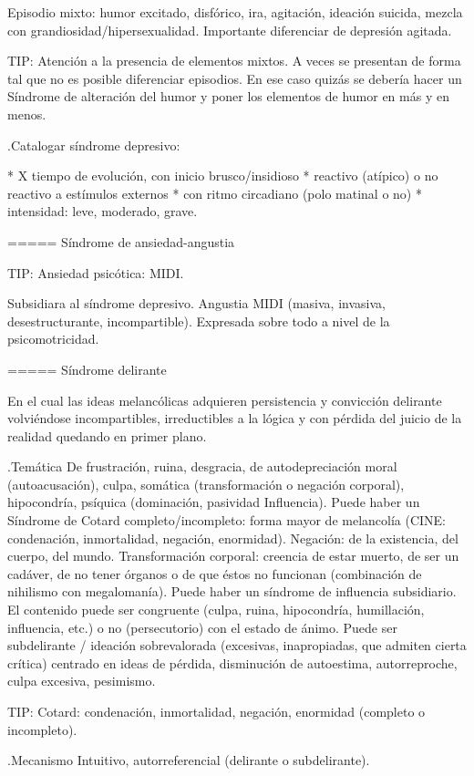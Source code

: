 \documentclass{scrbook}
\begin{document}
Episodio mixto: humor excitado, disfórico, ira, agitación, ideación suicida, mezcla con grandiosidad/hipersexualidad. Importante diferenciar de depresión agitada.

TIP: Atención a la presencia de elementos mixtos. A veces se presentan de forma tal que no es posible diferenciar episodios. En ese caso quizás se debería hacer un Síndrome de alteración del humor y poner los elementos de humor en más y en menos.

.Catalogar síndrome depresivo:

* X tiempo de evolución, con inicio brusco/insidioso
* reactivo (atípico) o no reactivo a estímulos externos
* con ritmo circadiano (polo matinal o no)
* intensidad: leve, moderado, grave.


===== Síndrome de ansiedad-angustia

TIP: Ansiedad psicótica: MIDI.

Subsidiara al síndrome depresivo. Angustia MIDI (masiva, invasiva, desestructurante, incompartible). Expresada sobre todo a nivel de la psicomotricidad.

===== Síndrome delirante

En el cual las ideas melancólicas adquieren persistencia y convicción delirante volviéndose incompartibles, irreductibles a la lógica y con pérdida del juicio de la realidad quedando en primer plano.

.Temática
De frustración, ruina, desgracia, de autodepreciación moral (autoacusación), culpa, somática (transformación o negación corporal), hipocondría, psíquica (dominación, pasividad Influencia). Puede haber un Síndrome de Cotard completo/incompleto: forma mayor de melancolía (CINE: condenación, inmortalidad, negación, enormidad). Negación: de la existencia, del cuerpo, del mundo. Transformación corporal: creencia de estar muerto, de ser un cadáver, de no tener órganos o de que éstos no funcionan (combinación de nihilismo con megalomanía).
Puede haber un síndrome de influencia subsidiario.
El contenido puede ser congruente (culpa, ruina, hipocondría, humillación, influencia, etc.) o no (persecutorio) con el estado de ánimo.
Puede ser subdelirante / ideación sobrevalorada (excesivas, inapropiadas, que admiten cierta crítica) centrado en ideas de pérdida, disminución de autoestima, autorreproche, culpa excesiva, pesimismo.

TIP: Cotard: condenación, inmortalidad, negación, enormidad (completo o incompleto).

.Mecanismo
Intuitivo, autorreferencial (delirante o subdelirante).
\end{document}
